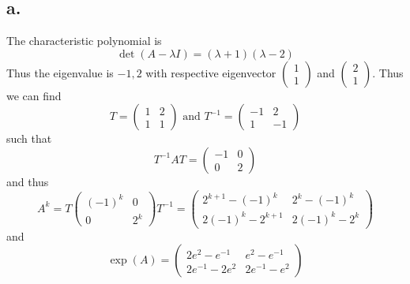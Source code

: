 \documentclass[11pt]{article}
\theoremstyle{mystyle}
\theoremstyle{definition}
\begin{document}
\subsection*{a.}
The characteristic polynomial is 
\[
  \det(A- \lambda I) = (\lambda + 1)(\lambda-2)
\]
Thus the eigenvalue is $-1,2$ with respective eigenvector
$ 
\begin{pmatrix}
  1 \\ 1
\end{pmatrix}
$
and 
$ 
\begin{pmatrix}
  2 \\ 1
\end{pmatrix}
$. Thus we can find 
\[
  T = 
  \begin{pmatrix}
    1 & 2 \\
    1 & 1
  \end{pmatrix}
  \text{ and }
  T^{-1} = 
  \begin{pmatrix}
    -1 & 2 \\
    1 & -1
  \end{pmatrix}
\]
such that 
\[
  T^{-1}AT = 
  \begin{pmatrix}
    -1 & 0 \\
    0 & 2
  \end{pmatrix}
\]
and thus  
\[
  A^k = T
  \begin{pmatrix}
    (-1)^k & 0 \\
    0 & 2^k
  \end{pmatrix}
  T^{-1}
  = 
  \begin{pmatrix}
    2^{k+1} - (-1)^k & 2^k - (-1)^k \\
    2(-1)^k- 2^{k+1} & 2(-1)^k - 2^k 
  \end{pmatrix}
\]
and 
\[
  \exp(A) = 
  \begin{pmatrix}
    2e^2 - e^{-1} & e^2 - e^{-1} \\
    2e^{-1} - 2e^2 & 2e^{-1} - e^2
  \end{pmatrix}
\]
\end{document}
